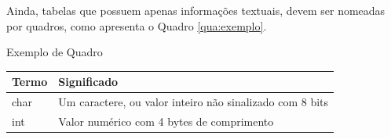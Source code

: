 \begin{apendicesenv}
    Ainda, tabelas que possuem apenas informações textuais, devem ser nomeadas por quadros, como apresenta o Quadro \ref{qua:exemplo}.

    \begin{quadro}[ht]
        \caption{Exemplo de Quadro}
        \begin{tabular}{ll}
            \toprule
            Termo & Significado \\
            \midrule
            char  & Um caractere, ou valor inteiro não sinalizado com 8 bits \\
            int   & Valor numérico com 4 bytes de comprimento \\
            \bottomrule
            \bottomrule
        \end{tabular}
        \label{qua:exemplo}
    \end{quadro}

\end{apendicesenv}
